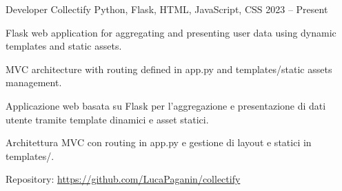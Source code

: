 \begin{cventries}
\cventry
{Developer} %
{Collectify} %
{Python, Flask, HTML, JavaScript, CSS} %
{2023 -- Present} %
{ %
\begin{cvitems}
  \ifenglish
  \item {Flask web application for aggregating and presenting user data using dynamic templates and static assets.}
  \item {MVC architecture with routing defined in app.py and templates/static assets management.}
  \else
  \item {Applicazione web basata su Flask per l'aggregazione e presentazione di dati utente tramite template dinamici e asset statici.}
  \item {Architettura MVC con routing in app.py e gestione di layout e statici in templates/.}
  \fi
  \item {Repository: \url{https://github.com/LucaPaganin/collectify}}  
\end{cvitems}
}

\end{cventries}